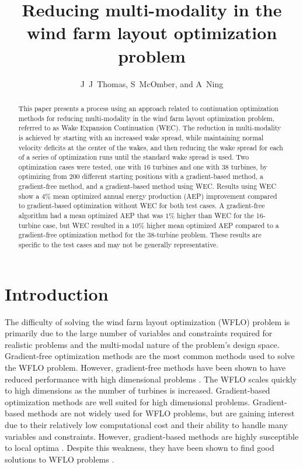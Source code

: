 \documentclass[a4paper]{jpconf}
\begin{document}
\title{Reducing multi-modality in the wind farm layout optimization problem}

\author{J~J~Thomas, S~McOmber, and A~Ning}
\address{Department of Mechanical Engineering,
Brigham Young University, Provo, Utah, USA}

\begin{abstract}
	This paper presents a process using an approach related to  continuation optimization methods for reducing multi-modality in the wind farm layout optimization problem, referred to as Wake Expansion Continuation (WEC). The reduction in multi-modality is achieved by starting with an increased wake spread, while maintaining normal velocity deficits at the center of the wakes, and then reducing the wake spread for each of a series of optimization runs until the standard wake spread is used. Two optimization cases were tested, one with 16 turbines and one with 38 turbines, by optimizing from 200 different starting positions with a gradient-based method, a gradient-free method, and a gradient-based method using WEC. Results using WEC show a $4\%$ mean optimized annual energy production (AEP) improvement compared to gradient-based optimization without WEC for both test cases. A gradient-free algorithm had a mean optimized AEP that was $1\%$ higher than WEC for the 16-turbine case, but WEC resulted in a $10\%$ higher mean optimized AEP compared to a gradient-free optimization method for the 38-turbine problem. These results are specific to the test cases and may not be generally representative.
\end{abstract}

\section{Introduction}

The difficulty of solving the wind farm layout optimization (WFLO) problem is primarily due to the large number of variables and constraints required for realistic problems and the multi-modal nature of the problem's design space. Gradient-free optimization methods are the most common methods used to solve the WFLO problem. However, gradient-free methods have been shown to have reduced performance with high dimensional problems \cite{rios2013-grad-free-comparison}. The WFLO scales quickly to high dimensions as the number of turbines is increased. Gradient-based optimization methods are well suited for high dimensional problems. Gradient-based methods are not widely used for WFLO problems, but are gaining interest due to their relatively low computational cost and their ability to handle many variables and constraints. However, gradient-based methods are highly susceptible to local optima \cite{acero2014}. Despite this weakness, they have been shown to find good solutions to WFLO problems \cite{fleming2015, guirguis2016, gebraad2017-Maximization-Annual}.  
\end{document}

